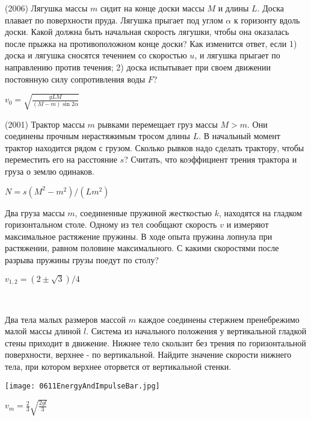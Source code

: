 \begin{ex}
(2006) Лягушка массы $m$ сидит на конце доски массы $M$ и длины $L$. Доска плавает по поверхности пруда. Лягушка прыгает под углом $\alpha$ к горизонту вдоль доски. Какой должна быть начальная скорость лягушки, чтобы она оказалась после прыжка на противоположном конце доски? Как изменится ответ, если 1) доска и лягушка сносятся течением со скоростью $u$, и лягушка прыгает по направлению против течения; 2) доска испытывает при своем движении постоянную силу сопротивления воды $F$?
\begin{ans}
$v_0 = \sqrt{\frac{gLM}{(M-m) \sin 2\alpha}}$
\end{ans}
\end{ex}

\begin{ex}
(2001) Трактор массы $m$ рывками перемещает груз массы $M>m$. Они соединены прочным нерастяжимым тросом длины $L$. В начальный момент трактор находится рядом с грузом. Сколько рывков надо сделать трактору, чтобы переместить его на расстояние $s$?  Считать, что коэффициент трения трактора и груза о землю одинаков.
\begin{ans}
$N = s(M^2-m^2)/(Lm^2)$
\end{ans}
\end{ex}

\begin{ex}
Два груза массы $m$, соединенные пружиной жесткостью $k$, находятся на гладком горизонтальном столе. Одному из тел сообщают скорость $v$ и измеряют максимальное растяжение пружины. В ходе опыта пружина лопнула при растяжении, равном половине максимального. С какими скоростями после разрыва пружины грузы поедут по столу?
\begin{ans}
$v_{1,2} = (2\pm \sqrt{3})/4$
\end{ans}
\end{ex}

\begin{ex}
\hspace{0pt} \\
\begin{minipage}{.65\textwidth}
Два тела малых размеров массой $m$ каждое соединены стержнем пренебрежимо малой массы длиной $l$. Система из начального положения у вертикальной гладкой стены приходит в движение. Нижнее тело скользит без трения по горизонтальной поверхности, верхнее - по вертикальной. Найдите значение скорости нижнего тела, при котором верхнее оторвется от вертикальной стенки.
\end{minipage}
\begin{minipage}{.35\textwidth}
\centering
\texttt{[image: 0611EnergyAndImpulseBar.jpg]}
\end{minipage}
\begin{ans}
$v_m = \frac{2}{3}\sqrt{\frac{2gl}{3}}$
\end{ans}
\end{ex}

